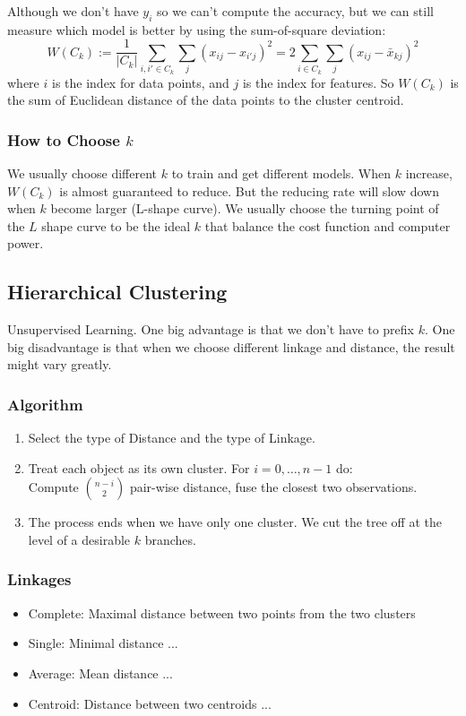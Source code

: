 \documentclass[12pt]{amsart}
\numberwithin{equation}{section}
\theoremstyle{plain}
\theoremstyle{definition}
\begin{document}
Although we don't have $y_i$ so we can't compute the accuracy, but we can still measure which model is better by using the sum-of-square deviation:
$$
W(C_k):=\frac{1}{|C_k|}\sum_{i,i'\in C_k}\sum_{j}(x_{ij}-x_{i'j})^2=2\sum_{i\in C_k}\sum_{j}(x_{ij}-\bar x_{kj})^2
$$
where $i$ is the index for data points, and $j$ is the index for features. So $W(C_k)$ is the sum of Euclidean distance of the data points to the cluster centroid.

\subsubsection{How to Choose $k$}
We usually choose different $k$ to train and get different models. When $k$ increase, $W(C_k)$ is almost guaranteed to reduce. But the reducing rate will slow down when $k$ become larger (L-shape curve). We usually choose the turning point of the $L$ shape curve to be the ideal $k$ that balance the cost function and computer power.

\subsection{Hierarchical Clustering}
Unsupervised Learning. One big advantage is that we don't have to prefix $k$. One big disadvantage is that when we choose different linkage and distance, the result might vary greatly.
\subsubsection{Algorithm}
\begin{enumerate}
\item Select the type of Distance and the type of Linkage.
\item Treat each object as its own cluster. For $i = 0, \ldots, n-1$ do:\\ Compute ${n-i}\choose{2}$ pair-wise distance, fuse the closest two observations.
\item The process ends when we have only one cluster. We cut the tree off at the level of a desirable $k$ branches.
\end{enumerate}

\subsubsection{Linkages}
\begin{itemize}
\item Complete: Maximal distance between two points from the two clusters
\item Single: Minimal distance ...
\item Average: Mean distance ...
\item Centroid: Distance between two centroids ...
\end{itemize}
\end{document}
